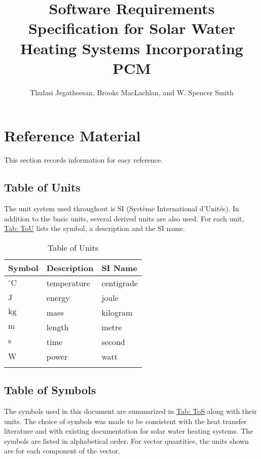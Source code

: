 \documentclass[12pt]{article}
\title{Software Requirements Specification for Solar Water Heating Systems Incorporating PCM}
\author{Thulasi Jegatheesan, Brooks MacLachlan, and W. Spencer Smith}
\begin{document}
\maketitle
\tableofcontents
\newpage
\section{Reference Material}
\label{Sec:RefMat}
This section records information for easy reference.

\subsection{Table of Units}
\label{Sec:ToU}
The unit system used throughout is SI (Système International d'Unités). In addition to the basic units, several derived units are also used. For each unit, \hyperref[Table:ToU]{Tab: ToU} lists the symbol, a description and the SI name.

\begin{longtable}{l l l}
\toprule
\textbf{Symbol} & \textbf{Description} & \textbf{SI Name}
\\
\midrule
\endhead
${{}^{\circ}\text{C}}$ & temperature & centigrade
\\
${\text{J}}$ & energy & joule
\\
${\text{kg}}$ & mass & kilogram
\\
${\text{m}}$ & length & metre
\\
${\text{s}}$ & time & second
\\
${\text{W}}$ & power & watt
\\
\bottomrule
\caption{Table of Units}
\label{Table:ToU}
\end{longtable}
\subsection{Table of Symbols}
\label{Sec:ToS}
The symbols used in this document are summarized in \hyperref[Table:ToS]{Tab: ToS} along with their units. The choice of symbols was made to be consistent with the heat transfer literature and with existing documentation for solar water heating systems. The symbols are listed in alphabetical order. For vector quantities, the units shown are for each component of the vector.
\end{document}
